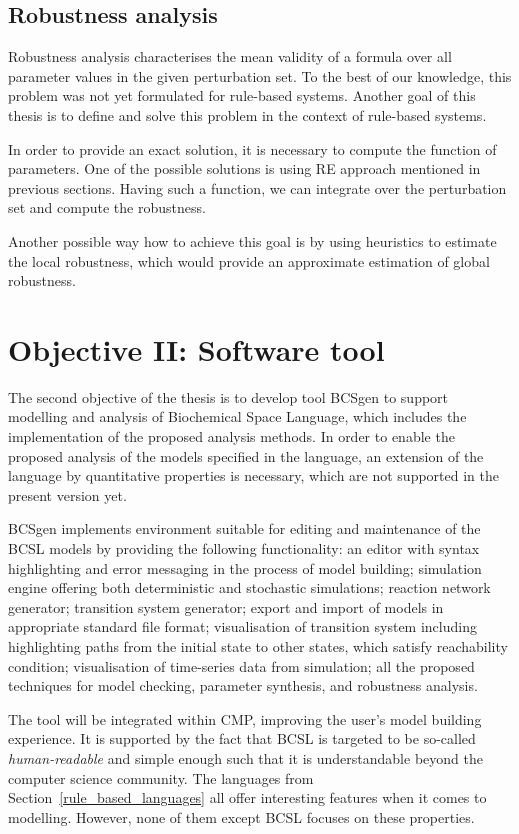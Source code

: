 \documentclass[11pt,a4paper]{report}
\begin{document}
\subsection{Robustness analysis}

Robustness analysis characterises the mean validity of a formula over all parameter values in the given perturbation set. To the best of our knowledge, this problem was not yet formulated for rule-based systems. Another goal of this thesis is to define and solve this problem in the context of rule-based systems. 

In order to provide an exact solution, it is necessary to compute the function of parameters. One of the possible solutions is using RE approach mentioned in previous sections. Having such a function, we can integrate over the perturbation set and compute the robustness. 

Another possible way how to achieve this goal is by using heuristics to estimate the local robustness, which would provide an approximate estimation of global robustness.

\section{Objective II: Software tool}

The second objective of the thesis is to develop tool BCSgen to support modelling and analysis of Biochemical Space Language, which includes the implementation of the proposed analysis methods. In order to enable the proposed analysis of the models specified in the language, an extension of the language by quantitative properties is necessary, which are not supported in the present version yet.

BCSgen implements environment suitable for editing and maintenance of the BCSL models by providing the following functionality: an editor with syntax highlighting and error messaging in the process of model building; simulation engine offering both deterministic and stochastic simulations; reaction network generator; transition system generator; export and import of models in appropriate standard file format; visualisation of transition system including highlighting paths from the initial state to other states, which satisfy reachability condition; visualisation of time-series data from simulation; all the proposed techniques for model checking, parameter synthesis, and robustness analysis.

The tool will be integrated within CMP, improving the user's model building experience. It is supported by the fact that BCSL is targeted to be so-called \emph{human-readable} and simple enough such that it is understandable beyond the computer science community. The languages from Section~\ref{rule_based_languages} all offer interesting features when it comes to modelling. However, none of them except BCSL focuses on these properties.
\end{document}
